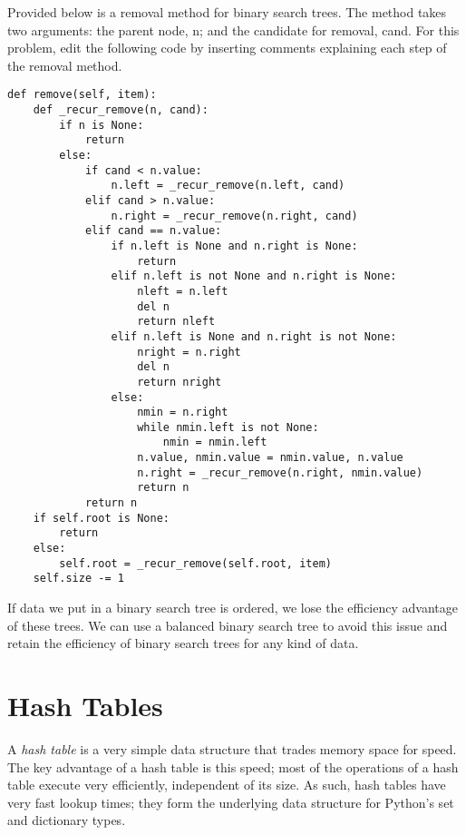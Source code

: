 \begin{problem}
Provided below is a removal method for binary search trees.
The  method takes two arguments: the parent node, n; and the candidate for removal, cand.
For this problem, edit the following code by inserting comments explaining each step of the removal method.

\begin{lstlisting}
def remove(self, item):
    def _recur_remove(n, cand):
        if n is None:
            return
        else:
            if cand < n.value:
                n.left = _recur_remove(n.left, cand)
            elif cand > n.value:
                n.right = _recur_remove(n.right, cand)
            elif cand == n.value:
                if n.left is None and n.right is None:
                    return
                elif n.left is not None and n.right is None:
                    nleft = n.left
                    del n
                    return nleft
                elif n.left is None and n.right is not None:
                    nright = n.right
                    del n
                    return nright
                else:
                    nmin = n.right
                    while nmin.left is not None:
                        nmin = nmin.left
                    n.value, nmin.value = nmin.value, n.value
                    n.right = _recur_remove(n.right, nmin.value)
                    return n
            return n
    if self.root is None:
        return
    else:
        self.root = _recur_remove(self.root, item)
    self.size -= 1
\end{lstlisting}
\label{prob:Binary Removal}
\end{problem}

If data we put in a binary search tree is ordered, we lose the efficiency advantage of these trees.
We can use a balanced binary search tree to avoid this issue and retain the efficiency of binary search trees for any kind of data.

\section*{Hash Tables}
A \emph{hash table} is a very simple data structure that trades memory space for speed.
The key advantage of a hash table is this speed; most of the operations of a hash table execute very efficiently, independent of its size.
As such, hash tables have very fast lookup times; they form the underlying data structure for Python's set and dictionary types.

